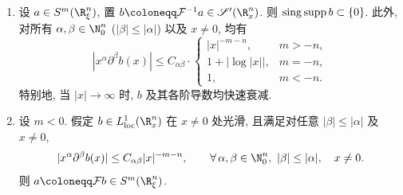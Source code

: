 \begin{proposition}\label{prop:4.8}
\begin{enumerate}
    \item 设 $a \in S^m(\R_\xi^n)$, 置 $b \defeq \mathcal{F}^{-1} a \in \TempDistr(\R_x^n)$. 则 $\operatorname{sing\,supp} b \subset \{0\}$. 此外, 对所有 $\alpha, \beta \in \N_0^n$ ($|\beta| \le |\alpha|$) 以及 $x \neq 0$, 均有
    \begin{equation}\label{eq:4.33}
        |x^\alpha \partial^\beta b(x)| \le C_{\alpha\beta} \cdot \begin{cases}
            |x|^{-m-n}, & m > -n, \\
            1 + |\log |x||, & m = -n, \\
            1, & m < -n.
        \end{cases}
    \end{equation}
    特别地, 当 $|x| \to \infty$ 时, $b$ 及其各阶导数均快速衰减.
    \item 设 $m < 0$. 假定 $b \in L^1_{\mathrm{loc}}(\R_x^n)$ 在 $x \neq 0$ 处光滑, 且满足对任意 $|\beta| \le |\alpha|$ 及 $x \neq 0$,
    \begin{equation}\label{eq:4.34}
        |x^\alpha \partial^\beta b(x)| \le C_{\alpha\beta} |x|^{-m-n}, \qquad \forall\,\alpha, \beta \in \N_0^n, \ |\beta| \le |\alpha|, \quad x \neq 0.
    \end{equation}
    则 $a \defeq \mathcal{F} b \in S^m(\R_\xi^n)$.
\end{enumerate}
\end{proposition}

